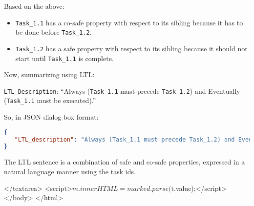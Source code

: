 \begin{tcolorbox}[breakable,title=Dialog 3: Extracting task-wise specification between Task\_1.1 and Task\_1.2]
Based on the above:
\begin{itemize}
    \item \texttt{Task\_1.1} has a co-safe property with respect to its sibling because it has to be done before \texttt{Task\_1.2}.
    \item \texttt{Task\_1.2} has a safe property with respect to its sibling because it should not start until \texttt{Task\_1.1} is complete.
\end{itemize}

Now, summarizing using LTL:

\texttt{LTL\_Description}: ``Always (\texttt{Task\_1.1} must precede \texttt{Task\_1.2}) and Eventually (\texttt{Task\_1.1} must be executed).''

So, in JSON dialog box format:

\begin{lstlisting}[language=JSON]
{
   "LTL_description": "Always (Task_1.1 must precede Task_1.2) and Eventually (Task_1.1 must be executed)."
}
\end{lstlisting}

The LTL sentence is a combination of safe and co-safe properties, expressed in a natural language manner using the task ids.

\end{tcolorbox}

  </textarea>
  <script>$m.innerHTML = marked.parse($t.value);</script>
</body>
</html>
